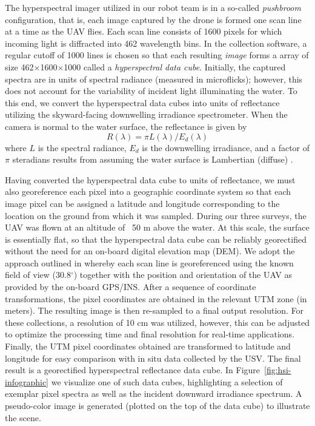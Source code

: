 \documentclass[remotesensing,article,submit,pdftex,moreauthors]{Definitions/mdpi}
\begin{document}
The hyperspectral imager utilized in our robot team is in a so-called \textit{pushbroom} configuration, that is, each image captured by the drone is formed one scan line at a time as the UAV flies. Each scan line consists of 1600 pixels for which incoming light is diffracted into 462 wavelength bins. In the collection software, a regular cutoff of 1000 lines is chosen so that each resulting \textit{image} forms a array of size 462$\times$1600$\times$1000 called a \textit{hyperspectral data cube}. Initially, the captured spectra are in units of spectral radiance (measured in microflicks); however, this does not account for the variability of incident light illuminating the water. To this end, we convert the hyperspectral data cubes into units of reflectance utilizing the skyward-facing downwelling irradiance spectrometer. When the camera is normal to the water surface, the reflectance is given by
\begin{equation}
    R(\lambda) = \pi L(\lambda)/E_d(\lambda)
\end{equation}
where $L$ is the spectral radiance, $E_d$ is the downwelling irradiance, and a factor of $\pi$ steradians results from assuming the water surface is Lambertian (diffuse) \cite{reflectance-conversion}. 

Having converted the hyperspectral data cube to units of reflectance, we must also georeference each pixel into a geographic coordinate system so that each image pixel can be assigned a latitude and longitude corresponding to the location on the ground from which it was sampled. During our three surveys, the UAV was flown at an altitude of ~50 m above the water. At this scale, the surface is essentially flat, so that the hyperspectral data cube can be reliably georectified without the need for an on-board digital elevation map (DEM). We adopt the approach outlined in \cite{GeorectificationMuller, GeorectificationBaumker, GeorectificationMostafa} whereby each scan line is georeferenced using the known field of view (30.8$^\circ$) together with the position and orientation of the UAV as provided by the on-board GPS/INS. After a sequence of coordinate transformations, the pixel coordinates are obtained in the relevant UTM zone (in meters). The resulting image is then re-sampled to a final output resolution. For these collections, a resolution of 10 cm was utilized, however, this can be adjusted to optimize the processing time and final resolution for real-time applications. Finally, the UTM pixel coordinates obtained are transformed to latitude and longitude for easy comparison with in situ data collected by the USV. The final result is a georectified hyperspectral reflectance data cube. In Figure~\ref{fig:hsi-infographic} we visualize one of such data cubes, highlighting a selection of exemplar pixel spectra as well as the incident downward irradiance spectrum. A pseudo-color image is generated (plotted on the top of the data cube) to illustrate the scene.
\end{document}
